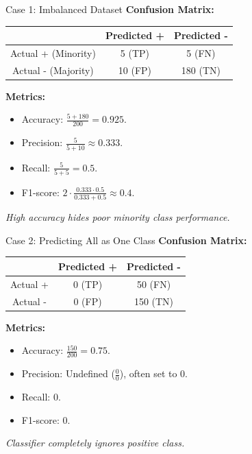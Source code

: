 \documentclass{beamer}
\begin{document}
\begin{frame}{Case 1: Imbalanced Dataset}
  \textbf{Confusion Matrix:}
  \begin{table}[h]
    \centering
    \begin{tabular}{|c|c|c|}
      \hline
      & Predicted + & Predicted - \\
      \hline
      Actual + (Minority) & 5 (TP) & 5 (FN) \\
      \hline
      Actual - (Majority) & 10 (FP) & 180 (TN) \\
      \hline
    \end{tabular}
  \end{table}
  \textbf{Metrics:}
  \begin{itemize}
    \item Accuracy: \( \frac{5 + 180}{200} = 0.925 \).
    \item Precision: \( \frac{5}{5 + 10} \approx 0.333 \).
    \item Recall: \( \frac{5}{5 + 5} = 0.5 \).
    \item F1-score: \( 2 \cdot \frac{0.333 \cdot 0.5}{0.333 + 0.5} \approx 0.4 \).
  \end{itemize}
  \textit{\small{High accuracy hides poor minority class performance.}}
\end{frame}

\begin{frame}{Case 2: Predicting All as One Class}
  \textbf{Confusion Matrix:}
  \begin{table}[h]
    \centering
    \begin{tabular}{|c|c|c|}
      \hline
      & Predicted + & Predicted - \\
      \hline
      Actual + & 0 (TP) & 50 (FN) \\
      \hline
      Actual - & 0 (FP) & 150 (TN) \\
      \hline
    \end{tabular}
  \end{table}
  \textbf{Metrics:}
  \begin{itemize}
    \item Accuracy: \( \frac{150}{200} = 0.75 \).
    \item Precision: Undefined (\( \frac{0}{0} \)), often set to 0.
    \item Recall: \( 0 \).
    \item F1-score: \( 0 \).
  \end{itemize}
  \textit{\small{Classifier completely ignores positive class.}}
\end{frame}
\end{document}
